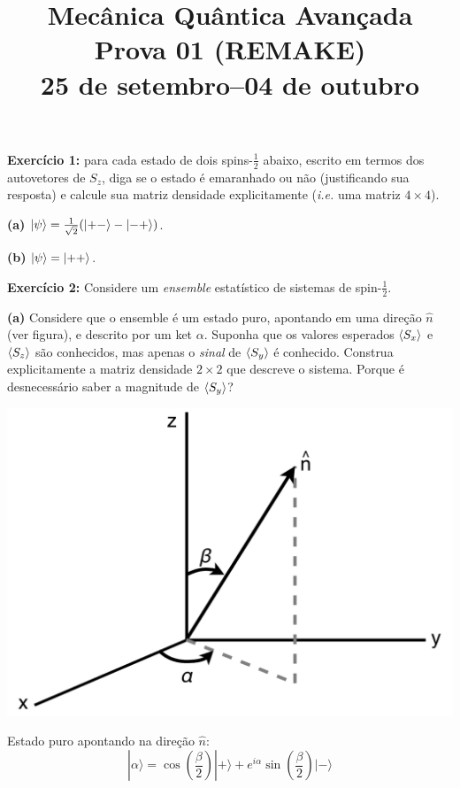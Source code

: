 \documentclass[12pt]{article}
\title{Mecânica Quântica Avançada\\%
Prova 01 (REMAKE)\\%
25 de setembro--04 de outubro}
\date{}
\begin{document}
\maketitle
\vspace*{-4em}

\textbf{Exercício 1:} para cada estado de dois spins-$\frac{1}{2}$ abaixo, escrito em termos dos autovetores de $S_z$, diga se o estado é emaranhado ou não (justificando sua resposta) e calcule sua matriz densidade explicitamente (\textit{i.e.} uma matriz $4\times4$).

\textbf{(a)} $\ket{\psi} = \frac{1}{\sqrt{2}}(\ket{+-}-\ket{-+})$.

\textbf{(b)} $\ket{\psi} = \ket{++}$.

\vspace*{1em}

\textbf{Exercício 2:} Considere um \emph{ensemble} estatístico de sistemas de spin-$\frac{1}{2}$.

\textbf{(a)} Considere que o ensemble é um estado puro, apontando em uma direção $\hat{n}$ (ver figura), e descrito por um ket $\alpha$. Suponha que os valores esperados $\ev{S_x}$ e $\ev{S_z}$ são conhecidos, mas apenas o \emph{sinal} de $\ev{S_y}$ é conhecido. Construa explicitamente a matriz densidade $2\times2$ que descreve o sistema. Porque é desnecessário saber a magnitude de $\ev{S_y}$?

\medskip

\begin{minipage}{0.4\textwidth}
\includegraphics[width=\textwidth]{Figures/nVersor.pdf}
\end{minipage}%
\begin{minipage}{0.6\textwidth}
Estado puro apontando na direção $\hat{n}$:
\[
|\alpha\rangle=\cos \left(\frac{\beta}{2}\right)|+\rangle+e^{i \alpha} \sin \left(\frac{\beta}{2}\right)|-\rangle
\]
\end{minipage}
\end{document}

